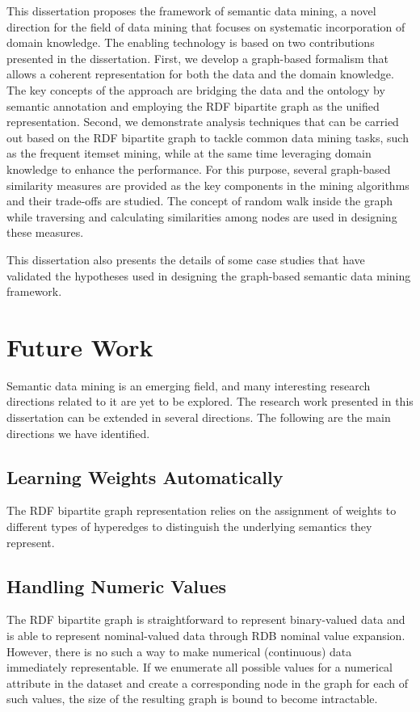 This dissertation proposes the framework of semantic data mining, a novel direction for the field of data mining that focuses on systematic incorporation of domain knowledge. The enabling technology is based on two contributions presented in the dissertation. First, we develop a graph-based formalism that allows a coherent representation for both the data and the domain knowledge. The key concepts of the approach are bridging the data and the ontology by semantic annotation and employing the RDF bipartite graph as the unified representation. Second, we demonstrate analysis techniques that can be carried out based on the RDF bipartite graph to tackle common data mining tasks, such as the frequent itemset mining, while at the same time leveraging domain knowledge to enhance the performance. For this purpose, several graph-based similarity measures are provided as the key components in the mining algorithms and their trade-offs are studied. The concept of random walk inside the graph while traversing and calculating similarities among nodes are used in designing these measures.

This dissertation also presents the details of some case studies that have validated the hypotheses used in designing the graph-based semantic data mining framework.

\section{Future Work}
Semantic data mining is an emerging field, and many interesting research directions related to it are yet to be explored. The research work presented in this dissertation can be extended in several directions. The following are the main directions we have identified.

\subsection{Learning Weights Automatically}
The RDF bipartite graph representation relies on the assignment of weights to different types of hyperedges to distinguish the underlying semantics they represent.
\subsection{Handling Numeric Values}
The RDF bipartite graph is straightforward to represent binary-valued data and is able to represent nominal-valued data through RDB nominal value expansion. However, there is no such a way to make numerical (continuous) data immediately representable. If we enumerate all possible values for a numerical attribute in the dataset and create a corresponding node in the graph for each of such values, the size of the resulting graph is bound to become intractable.
